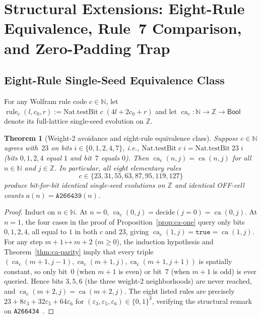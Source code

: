 \documentclass[11pt]{article}
\newtheorem{theorem}{Theorem}[section]
\theoremstyle{definition}
\newcommand{\N}{\mathbb{N}}
\newcommand{\Z}{\mathbb{Z}}
\newcommand{\seq}[1]{\texttt{#1}}
\newcommand{\ca}{\operatorname{ca}}
\begin{document}
\section{Structural Extensions: Eight-Rule Equivalence, Rule~7 Comparison, and Zero-Padding Trap}

\subsection{Eight-Rule Single-Seed Equivalence Class}

For any Wolfram rule code $c \in \N$, let $\operatorname{rule}_c(l, c_0, r) := \mathrm{Nat.testBit}\;c\;(4l + 2c_0 + r)$ and let $\ca_c : \N \to \Z \to \mathsf{Bool}$ denote its full-lattice single-seed evolution on $\Z$.

\begin{theorem}[Weight-$2$ avoidance and eight-rule equivalence class]
\label{thm:equiv-class}
Suppose $c \in \N$ agrees with~$23$ on bits $i \in \{0, 1, 2, 4, 7\}$, i.e., $\mathrm{Nat.testBit}\;c\;i = \mathrm{Nat.testBit}\;23\;i$ (bits $0, 1, 2, 4$ equal $1$ and bit~$7$ equals $0$). Then $\ca_c(n, j) = \ca(n, j)$ for all $n \in \N$ and $j \in \Z$. In particular, all eight elementary rules
\[
c \in \{23, 31, 55, 63, 87, 95, 119, 127\}
\]
produce bit-for-bit identical single-seed evolutions on $\Z$ and identical OFF-cell counts $a(n) = \seq{A266439}(n)$.
\end{theorem}

\begin{proof}
Induct on $n \in \N$. At $n = 0$, $\ca_c(0, j) = \mathrm{decide}(j = 0) = \ca(0, j)$. At $n = 1$, the four cases in the proof of Proposition~\ref{prop:ca-one} query only bits $0, 1, 2, 4$, all equal to $1$ in both $c$ and $23$, giving $\ca_c(1, j) = \mathtt{true} = \ca(1, j)$. For any step $m + 1 \mapsto m + 2$ ($m \ge 0$), the induction hypothesis and Theorem~\ref{thm:ca-parity} imply that every triple $(\ca_c(m+1, j-1), \ca_c(m+1, j), \ca_c(m+1, j+1))$ is spatially constant, so only bit~$0$ (when $m + 1$ is even) or bit~$7$ (when $m + 1$ is odd) is ever queried. Hence bits $3, 5, 6$ (the three weight-$2$ neighborhoods) are never reached, and $\ca_c(m + 2, j) = \ca(m + 2, j)$. The eight listed rules are precisely $23 + 8\varepsilon_3 + 32\varepsilon_5 + 64\varepsilon_6$ for $(\varepsilon_3, \varepsilon_5, \varepsilon_6) \in \{0, 1\}^3$, verifying the structural remark on \seq{A266434}~\cite{oeis266434}.
\end{proof}
\end{document}
